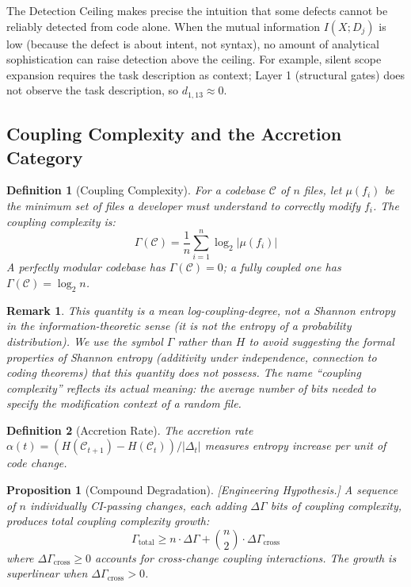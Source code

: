 \documentclass[11pt, a4paper, logo, copyright]{googledeepmind}
\newtheorem{definition}{Definition}[section]
\newtheorem{proposition}{Proposition}[section]
\newtheorem*{remark}{Remark}
\begin{document}
The Detection Ceiling makes precise the intuition that some defects cannot be reliably detected from code alone. When the mutual information $I(X; D_j)$ is low (because the defect is about intent, not syntax), no amount of analytical sophistication can raise detection above the ceiling. For example, silent scope expansion requires the task description as context; Layer 1 (structural gates) does not observe the task description, so $d_{1,13} \approx 0$.

\subsection{Coupling Complexity and the Accretion Category}

\begin{definition}[Coupling Complexity]
\label{def:codebase-entropy}
For a codebase $\mathcal{C}$ of $n$ files, let $\mu(f_i)$ be the minimum set of files a developer must understand to correctly modify $f_i$. The \emph{coupling complexity} is:
\begin{equation}
\Gamma(\mathcal{C}) = \frac{1}{n} \sum_{i=1}^{n} \log_2 |\mu(f_i)|
\end{equation}
A perfectly modular codebase has $\Gamma(\mathcal{C}) = 0$; a fully coupled one has $\Gamma(\mathcal{C}) = \log_2 n$.
\end{definition}

\begin{remark}
This quantity is a mean log-coupling-degree, not a Shannon entropy in the information-theoretic sense (it is not the entropy of a probability distribution). We use the symbol $\Gamma$ rather than $H$ to avoid suggesting the formal properties of Shannon entropy (additivity under independence, connection to coding theorems) that this quantity does not possess. The name ``coupling complexity'' reflects its actual meaning: the average number of bits needed to specify the modification context of a random file.
\end{remark}

\begin{definition}[Accretion Rate]
The accretion rate $\alpha(t) = (H(\mathcal{C}_{t+1}) - H(\mathcal{C}_t)) / |\Delta_t|$ measures entropy increase per unit of code change.
\end{definition}

\begin{proposition}[Compound Degradation]
\label{thm:compound-degradation}
\emph{[Engineering Hypothesis.]} A sequence of $n$ individually CI-passing changes, each adding $\Delta \Gamma$ bits of coupling complexity, produces total coupling complexity growth:
\begin{equation}
    \Gamma_{\text{total}} \geq n \cdot \Delta \Gamma + \binom{n}{2} \cdot \Delta \Gamma_{\text{cross}}
\end{equation}
where $\Delta \Gamma_{\text{cross}} \geq 0$ accounts for cross-change coupling interactions. The growth is superlinear when $\Delta \Gamma_{\text{cross}} > 0$.
\end{proposition}
\end{document}
